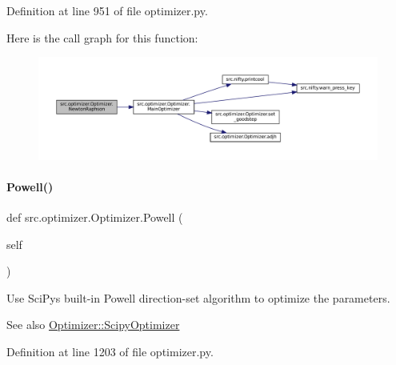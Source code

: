 Definition at line 951 of file optimizer.\+py.

Here is the call graph for this function\+:
\nopagebreak
\begin{figure}[H]
\begin{center}
\leavevmode
\includegraphics[width=350pt]{classsrc_1_1optimizer_1_1Optimizer_aee3a09f71220a784ef9541ce54270711_cgraph}
\end{center}
\end{figure}
\mbox{\label{classsrc_1_1optimizer_1_1Optimizer_aba1d50ad4756203f83a5be844972f0a2}} 
\paragraph{\texorpdfstring{Powell()}{Powell()}}
{\footnotesize\ttfamily def src.\+optimizer.\+Optimizer.\+Powell (\begin{DoxyParamCaption}\item[{}]{self }\end{DoxyParamCaption})}



Use Sci\+Py\textquotesingle{}s built-\/in Powell direction-\/set algorithm to optimize the parameters. 

\begin{DoxySeeAlso}{See also}
\hyperlink{classsrc_1_1optimizer_1_1Optimizer_a1e616a4c920b3e8935ca19e208b1c3be}{Optimizer\+::\+Scipy\+Optimizer} 
\end{DoxySeeAlso}


Definition at line 1203 of file optimizer.\+py.

